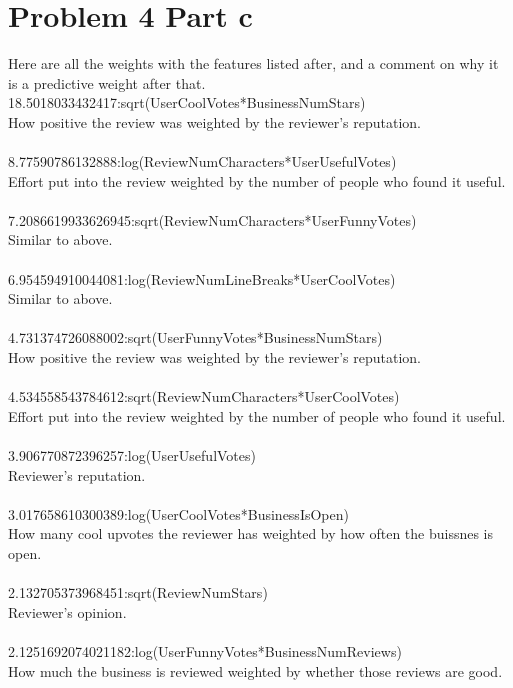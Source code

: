 \documentclass{article}
\newcommand{\1}{\mathbf{1}}
\begin{document}
\section*{Problem 4 Part c}
Here are all the weights with the features listed after, and a comment on why it is a predictive weight after that. \\
18.5018033432417:sqrt(UserCoolVotes*BusinessNumStars) \\
How positive the review was weighted by the reviewer's reputation. \\ \\
8.77590786132888:log(ReviewNumCharacters*UserUsefulVotes) \\
Effort put into the review weighted by the number of people who found it useful. \\ \\
7.2086619933626945:sqrt(ReviewNumCharacters*UserFunnyVotes) \\
Similar to above. \\ \\
6.954594910044081:log(ReviewNumLineBreaks*UserCoolVotes) \\
Similar to above. \\ \\
4.731374726088002:sqrt(UserFunnyVotes*BusinessNumStars) \\
How positive the review was weighted by the reviewer's reputation. \\ \\
4.534558543784612:sqrt(ReviewNumCharacters*UserCoolVotes) \\
Effort put into the review weighted by the number of people who found it useful. \\ \\
3.906770872396257:log(UserUsefulVotes) \\
Reviewer's reputation. \\ \\
3.017658610300389:log(UserCoolVotes*BusinessIsOpen) \\
How many cool upvotes the reviewer has weighted by how often the buissnes is open. \\ \\
2.132705373968451:sqrt(ReviewNumStars) \\
Reviewer's opinion. \\ \\
2.1251692074021182:log(UserFunnyVotes*BusinessNumReviews) \\
How much the business is reviewed weighted by whether those reviews are good. \\ \\
\end{document}
